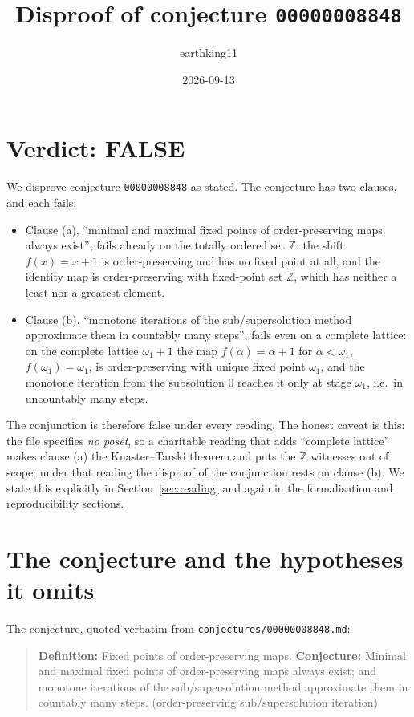 \documentclass[11pt]{article}
\title{Disproof of conjecture \texttt{00000008848}}
\author{earthking11}
\date{2026-09-13}
\theoremstyle{definition}
\theoremstyle{remark}
\newcommand{\Z}{\mathbb{Z}}
\begin{document}
\maketitle

\section*{Verdict: FALSE}

We disprove conjecture \texttt{00000008848} as stated. The conjecture has two
clauses, and each fails:

\begin{itemize}
  \item Clause (a), ``minimal and maximal fixed points of order-preserving maps
    always exist'', fails already on the totally ordered set $\Z$: the shift
    $f(x)=x+1$ is order-preserving and has no fixed point at all, and the
    identity map is order-preserving with fixed-point set $\Z$, which has
    neither a least nor a greatest element.
  \item Clause (b), ``monotone iterations of the sub/supersolution method
    approximate them in countably many steps'', fails even on a complete
    lattice: on the complete lattice $\omega_1+1$ the map
    $f(\alpha)=\alpha+1$ for $\alpha<\omega_1$, $f(\omega_1)=\omega_1$, is
    order-preserving with unique fixed point $\omega_1$, and the monotone
    iteration from the subsolution $0$ reaches it only at stage $\omega_1$,
    i.e.\ in uncountably many steps.
\end{itemize}

The conjunction is therefore false under every reading. The honest caveat is
this: the file specifies \emph{no poset}, so a charitable reading that adds
``complete lattice'' makes clause (a) the Knaster--Tarski theorem and puts the
$\Z$ witnesses out of scope; under that reading the disproof of the conjunction
rests on clause (b). We state this explicitly in
Section~\ref{sec:reading} and again in the formalisation and reproducibility
sections.

\section{The conjecture and the hypotheses it omits}

The conjecture, quoted verbatim from \texttt{conjectures/00000008848.md}:

\begin{quote}
\textbf{Definition:} Fixed points of order-preserving maps. \textbf{Conjecture:}
Minimal and maximal fixed points of order-preserving maps always exist; and
monotone iterations of the sub/supersolution method approximate them in
countably many steps. (order-preserving sub/supersolution iteration)
\end{quote}
\end{document}
